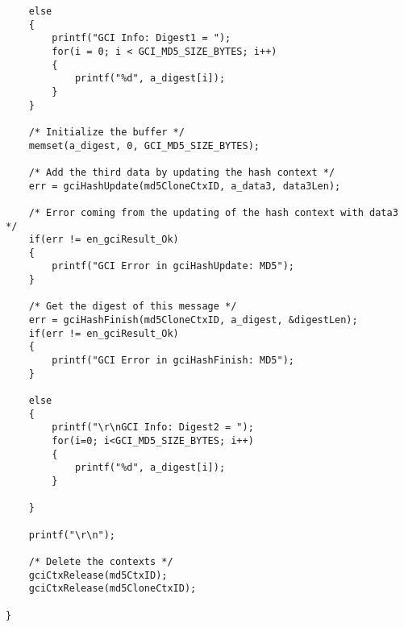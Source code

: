 \begin{lstlisting}
    else
    {
        printf("GCI Info: Digest1 = ");
        for(i = 0; i < GCI_MD5_SIZE_BYTES; i++)
        {
            printf("%d", a_digest[i]);
        }
    }

    /* Initialize the buffer */
    memset(a_digest, 0, GCI_MD5_SIZE_BYTES);

    /* Add the third data by updating the hash context */
    err = gciHashUpdate(md5CloneCtxID, a_data3, data3Len);

    /* Error coming from the updating of the hash context with data3 */
    if(err != en_gciResult_Ok)
    {
        printf("GCI Error in gciHashUpdate: MD5");
    }

    /* Get the digest of this message */
    err = gciHashFinish(md5CloneCtxID, a_digest, &digestLen);
    if(err != en_gciResult_Ok)
    {
        printf("GCI Error in gciHashFinish: MD5");
    }

    else
    {
        printf("\r\nGCI Info: Digest2 = ");
        for(i=0; i<GCI_MD5_SIZE_BYTES; i++)
        {
            printf("%d", a_digest[i]);
        }

    }

    printf("\r\n");

    /* Delete the contexts */
    gciCtxRelease(md5CtxID);
    gciCtxRelease(md5CloneCtxID);

}

\end{lstlisting}